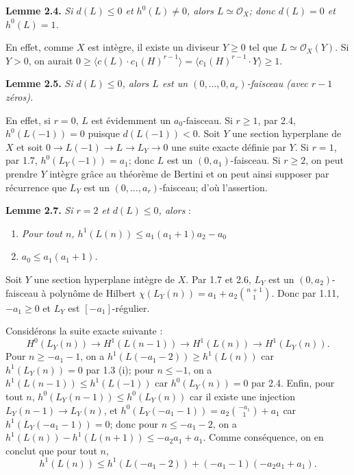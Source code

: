 \textbf{Lemme 2.4.} \emph{Si \(d(L)\le0\) et \(h^0(L)\ne0\), alors \(L\simeq\mathcal O_X\); donc \(d(L)=0\) et \(h^0(L)=1\).}

En effet, comme \(X\) est intègre, il existe un diviseur \(Y\ge0\) tel que \(L\simeq\mathcal O_X(Y)\). Si \(Y>0\), on aurait \(0\ge\langle c(L)\cdot c_1(H)^{r-1}\rangle=\langle c_1(H)^{r-1}\cdot Y\rangle\ge1\).

\textbf{Lemme 2.5.} \emph{Si \(d(L)\le0\), alors \(L\) est un \((0,\ldots,0,a_r)\)-faisceau (avec \(r-1\) zéros).}

En
effet, si \(r=0\), \(L\) est évidemment un \(a_0\)-faisceau. Si \(r\ge1\), par 2.4, \(h^0(L(-1))=0\) puisque \(d(L(-1))<0\). Soit \(Y\) une section hyperplane de \(X\) et soit \(0\longrightarrow L(-1)\longrightarrow L\longrightarrow L_Y\longrightarrow0\) une suite exacte définie par \(Y\). Si \(r=1\), par 1.7, \(h^0(L_Y(-1))=a_1\); donc \(L\) est un \((0,a_1)\)-faisceau. Si \(r\ge2\), on peut prendre \(Y\) intègre grâce au théorème de Bertini et on peut ainsi supposer par récurrence que \(L_Y\) est un \((0,\ldots,a_r)\)-faisceau; d'où l'assertion.

\textbf{Lemme 2.7.} \emph{Si \(r=2\) et \(d(L)\le0\), alors} :
\begin{enumerate}[label=(\roman*)]
\item \emph{Pour tout \(n\), \(h^1(L(n))\le a_1(a_1+1)a_2-a_0\)}
\item \emph{\(a_0\le a_1(a_1+1)\).}
\end{enumerate}

Soit \(Y\) une section hyperplane intègre de \(X\). Par 1.7 et 2.6, \(L_Y\) est un \((0,a_2)\)-faisceau à polynôme de Hilbert \(\chi(L_Y(n))=a_1+a_2\binom{n+1}{1}\). Donc par 1.11, \(-a_1\ge0\) et \(L_Y\) est \([-a_1]\)-régulier.

Considérons la suite exacte suivante :
\[
H^0(L_Y(n))\longrightarrow H^1(L(n-1))
\longrightarrow H^1(L(n))\longrightarrow H^1(L_Y(n)).
\]
Pour \(n\ge -a_1-1\), on a \(h^1(L(-a_1-2))\ge h^1(L(n))\) car \(h^1(L_Y(n))=0\) par 1.3 (i); pour \(n\le -1\), on a \(h^1(L(n-1))\le h^1(L(-1))\) car \(h^0(L_Y(n))=0\) par 2.4. Enfin, pour tout \(n\), \(h^0(L_Y(n-1))\le h^0(L_Y(n))\) car il existe une injection \(L_Y(n-1)\longrightarrow L_Y(n)\), et \(h^0(L_Y(-a_1-1))=a_2\binom{-a_1}{1}+a_1\) car \(h^1(L_Y(-a_1-1))=0\); donc pour \(n\le -a_1-2\), on a \(h^1(L(n))-h^1(L(n+1))\le -a_2a_1+a_1\). Comme conséquence, on en conclut que pour tout \(n\),
\[
h^1(L(n))\le h^1(L(-a_1-2))+(-a_1-1)(-a_2a_1+a_1).
\tag{2.7.1}
\]

